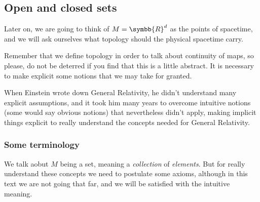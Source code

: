 \subsection{Open and closed sets}
Later on, we are going to think of $M = \symbb{R}^d$ as the points of spacetime, and we will ask
ourselves what topology should the physical spacetime carry.

Remember that we define topology in order to talk about continuity of maps, so please, do not
be deterred if you find that this is a little abstract. It is necessary to make explicit some
notions that we may take for granted.

When Einstein wrote down General Relativity, he didn't understand many explicit assumptions, and
it took him many years to overcome intuitive notions (some would say obvious notions) that
nevertheless didn't apply, making implicit things explicit to really understand the concepts
needed for General Relativity.

\subsubsection{Some terminology}
We talk aobut $M$ being a set, meaning a \emph{collection} of \emph{elements}. But for really
understand these concepts we need to postulate some axioms, although in this text we are not going
that far, and we will be satisfied with the intuitive meaning.

